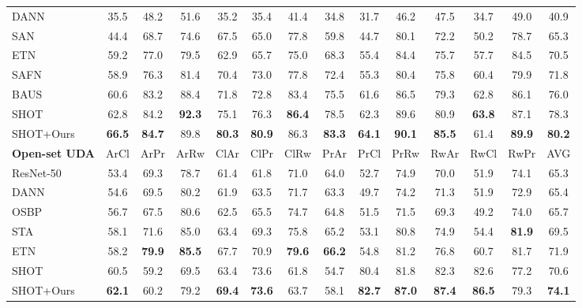 \documentclass[10pt,twocolumn,letterpaper]{article}
\begin{document}
\begin{table*}
{{\begin{tabular}{lccccccccccccc}
        DANN~\cite{ganin2015DANN} & 35.5 & 48.2 & 51.6 & 35.2 & 35.4 & 41.4 & 34.8 & 31.7 & 46.2 & 47.5 & 34.7 & 49.0 & 40.9 \\
SAN~\cite{cao2018SAN} & 44.4 & 68.7 & 74.6 & 67.5 & 65.0 & 77.8 & 59.8 & 44.7 & 80.1 & 72.2 & 50.2 & 78.7 & 65.3 \\
        ETN~\cite{cao2019ETN} & 59.2 & 77.0 & 79.5 & 62.9 & 65.7 & 75.0 & 68.3 & 55.4 & 84.4 & 75.7 & 57.7 & 84.5 & 70.5 \\
        SAFN~\cite{xu2019SAFN} & 58.9 & 76.3 & 81.4 & 70.4 & 73.0 & 77.8 & 72.4 & 55.3 & 80.4 & 75.8 & 60.4 & 79.9 & 71.8 \\
        BAUS~\cite{liang2020BA3US} & 60.6 & 83.2 & 88.4 & 71.8 & 72.8 & 83.4 & 75.5 & 61.6 & 86.5 & 79.3 & 62.8 & 86.1 & 76.0 \\
SHOT~\cite{liang2020shot} & 62.8 & 84.2 & \textbf{92.3} & 75.1 & 76.3 & \textbf{86.4} & 78.5 & 62.3 & 89.6 & 80.9 & \textbf{63.8} & 87.1 & 78.3 \\
SHOT+Ours & \textbf{66.5} & \textbf{84.7} & 89.8 & \textbf{80.3} & \textbf{80.9} & 86.3 & \textbf{83.3} & \textbf{64.1} & \textbf{90.1} & \textbf{85.5} & 61.4 & \textbf{89.9} & \textbf{80.2} \\
        \hline \hline
        \textbf{Open-set UDA} & ArCl & ArPr & ArRw & ClAr & ClPr & ClRw & PrAr & PrCl & PrRw & RwAr & RwCl & RwPr & AVG \\
\midrule
        ResNet-50~\cite{he2016resnet} & 53.4 & 69.3 & 78.7 & 61.4 & 61.8 & 71.0 & 64.0 & 52.7 & 74.9 & 70.0 & 51.9 & 74.1 & 65.3 \\
        DANN~\cite{ganin2015DANN}     & 54.6 & 69.5 & 80.2 & 61.9 & 63.5 & 71.7 & 63.3 & 49.7 & 74.2 & 71.3 & 51.9 & 72.9 & 65.4 \\
        OSBP~\cite{saito2018OSBP}     & 56.7 & 67.5 & 80.6 & 62.5 & 65.5 & 74.7 & 64.8 & 51.5 & 71.5 & 69.3 & 49.2 & 74.0 & 65.7 \\
        STA~\cite{liu2019STA} & 58.1 & 71.6 & 85.0 & 63.4 & 69.3 & 75.8 & 65.2 & 53.1 & 80.8 & 74.9 & 54.4 & \textbf{81.9} & 69.5 \\
        ETN~\cite{cao2019ETN} & 58.2 & \textbf{79.9} & \textbf{85.5} & 67.7 & 70.9 & \textbf{79.6} & \textbf{66.2} & 54.8 & 81.2 & 76.8 & 60.7 & 81.7 & 71.9 \\
SHOT~\cite{liang2020shot} & 60.5 & 59.2 & 69.5 & 63.4 & 73.6 & 61.8 & 54.7 & 80.4 & 81.8 & 82.3 & 82.6 & 77.2 & 70.6 \\
SHOT+Ours & \textbf{62.1} & 60.2 & 79.2 & \textbf{69.4} & \textbf{73.6} & 63.7 & 58.1 & \textbf{82.7} & \textbf{87.0} & \textbf{87.4} & \textbf{86.5} & 79.3 & \textbf{74.1} \\

\end{tabular}}}
\end{table*}
\end{document}
